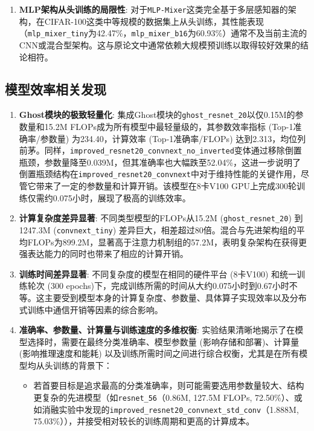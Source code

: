 \documentclass[a4paper]{article}
\begin{document}
\begin{enumerate}
    \item \textbf{MLP架构从头训练的局限性}: 对于\texttt{MLP-Mixer}这类完全基于多层感知器的架构，在CIFAR-100这类中等规模的数据集上从头训练，其性能表现（\texttt{mlp\_mixer\_tiny}为42.47\%，\texttt{mlp\_mixer\_b16}为60.93\%）通常不及当前主流的CNN或混合型架构。这与原论文中通常依赖大规模预训练以取得较好效果的结论相符。
\end{enumerate}

\subsection{模型效率相关发现}
\begin{enumerate}
    \item \textbf{Ghost模块的极致轻量化}: 集成Ghost模块的\texttt{ghost\_resnet\_20}以仅0.15M的参数量和15.2M FLOPs成为所有模型中最轻量级的，其参数效率指标 (Top-1准确率/参数量) 为234.40，计算效率 (Top-1准确率/FLOPs) 达到2.313，均位列前茅。同样，\texttt{improved\_resnet20\_convnext\_no\_inverted}变体通过移除倒置瓶颈，参数量降至0.039M，但其准确率也大幅跌至52.04\%，这进一步说明了倒置瓶颈结构在\texttt{improved\_resnet20\_convnext}中对于维持性能的关键作用，尽管它带来了一定的参数量和计算开销。该模型在8卡V100 GPU上完成300轮训练仅需约0.075小时，展现了极高的训练效率。
    \item \textbf{计算复杂度差异显著}: 不同类型模型的FLOPs从15.2M (\texttt{ghost\_resnet\_20}) 到1247.3M (\texttt{convnext\_tiny}) 差异巨大，相差超过80倍。混合与先进架构组的平均FLOPs为899.2M，显著高于注意力机制组的57.2M，表明复杂架构在获得更强表达能力的同时也带来了相应的计算开销。
    \item \textbf{训练时间差异显著}: 不同复杂度的模型在相同的硬件平台 (8卡V100) 和统一训练轮次 (300 epochs)下，完成训练所需的时间从大约0.075小时到0.67小时不等。这主要受到模型本身的计算复杂度、参数量、具体算子实现效率以及分布式训练中通信开销等因素的综合影响。
    \item \textbf{准确率、参数量、计算量与训练速度的多维权衡}: 实验结果清晰地揭示了在模型选择时，需要在最终分类准确率、模型参数量 (影响存储和部署)、计算量 (影响推理速度和能耗) 以及训练所需时间之间进行综合权衡，尤其是在所有模型均从头训练的背景下：
        \begin{itemize}
            \item 若首要目标是追求最高的分类准确率，则可能需要选用参数量较大、结构更复杂的先进模型（如\texttt{resnet\_56}（0.86M, 127.5M FLOPs, 72.50\%）、或如消融实验中发现的\texttt{improved\_resnet20\_convnext\_std\_conv}（1.888M, 75.03\%）），并接受相对较长的训练周期和更高的计算成本。

\end{itemize}
\end{enumerate}
\end{document}
